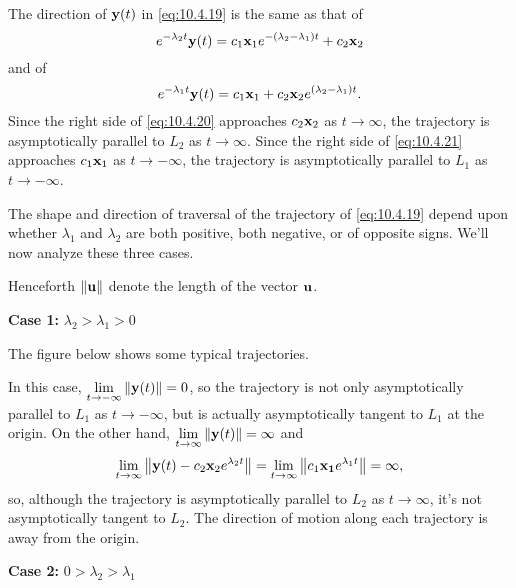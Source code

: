 \documentclass{ximera}
\begin{document}
The direction of ${\bf y}(t)$ in \eqref{eq:10.4.19} is the
same as that of
\begin{equation} \label{eq:10.4.20}
e^{-\lambda_2 t}{\bf y}(t)=
c_1{\bf x}_1e^{-(\lambda_2-\lambda_1)t}+c_2{\bf x}_2
\end{equation}
and of
\begin{equation} \label{eq:10.4.21}
e^{-\lambda_1 t}{\bf y}(t)=c_1{\bf
x}_1+c_2{\bf x}_2e^{(\lambda_2-\lambda_1)t}.
\end{equation}
Since the right side of \eqref{eq:10.4.20} approaches $c_2{\bf x}_2$ as
$t\rightarrow\infty$, the trajectory is asymptotically parallel to $L_2$ as
$t\rightarrow\infty$. Since the right side of \eqref{eq:10.4.21} approaches
$c_1{\bf x}_1$ as $t\rightarrow-\infty$, the trajectory is asymptotically
parallel to $L_1$ as $t\rightarrow -\infty$.

The shape and direction of
traversal of the trajectory of \eqref{eq:10.4.19} depend upon whether
$\lambda_1$ and $\lambda_2$ are both positive, both negative, or of
opposite signs. We'll now analyze these three cases.

Henceforth $\left\lVert{\bf u}\right\rVert$  denote the length of the vector
${\bf u}$.




{\bf Case 1:} $\lambda_2>\lambda_1>0$

The figure below  shows some
 typical trajectories.

\begin{center}
\end{center}

 
In this case, $\lim_{t\rightarrow -\infty}\norm{{\bf y}(t)}=0$, so the trajectory
is not only asymptotically parallel to $L_1$ as $t\rightarrow -\infty$, but is
actually asymptotically tangent to $L_1$ at the origin. On
the other hand, $\lim_{t\rightarrow\infty}\norm{{\bf y}(t)}=\infty$ and
$$
\lim_{t\rightarrow\infty}\norm{{\bf y}(t)-c_2{\bf x}_2e^{\lambda_2
t}}=\lim_{t\rightarrow\infty}\norm{c_1{\bf x_1}e^{\lambda_1t}}=\infty,
$$
so, although the trajectory is asymptotically parallel to $L_2$ as
$t\rightarrow\infty$, it's not asymptotically tangent to $L_2$.
The direction of motion along each trajectory is away from the origin.

{\bf Case 2:} $0>\lambda_2>\lambda_1$
\end{document}
